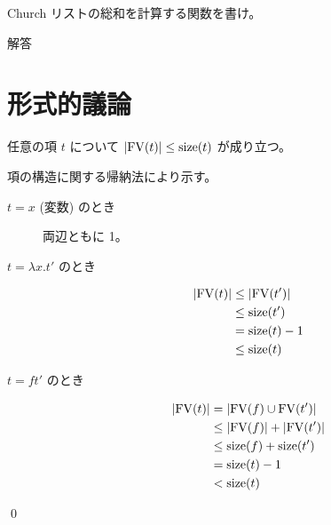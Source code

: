 \begin{jexercise*}[5.2.11]
  Church リストの総和を計算する関数を書け。
\end{jexercise*}
\begin{itembox}[l]{解答}
\end{itembox}

\section{形式的議論}

\begin{jexercise*}[5.3.3]
  任意の項 $t$ について $\left| \operatorname{FV}(t) \right| \leq \operatorname{size}(t)$ が成り立つ。
\end{jexercise*}
\begin{jproof}
  項の構造に関する帰納法により示す。
  \begin{description}
    \item[$t = x$ (変数) のとき]
      両辺ともに 1。
    \item[$t = \lambda x. t'$ のとき]
      \begin{align*}
        \left| \operatorname{FV}(t) \right|
          & \leq \left| \operatorname{FV}(t') \right|
        \\ & \leq \operatorname{size}(t')
        \\ & = \operatorname{size}(t) - 1
        \\ & \leq \operatorname{size}(t)
      \end{align*}
    \item[$t = f t'$ のとき]
      \begin{align*}
        \left| \operatorname{FV}(t) \right|
          & = \left| \operatorname{FV}(f) \cup \operatorname{FV}(t') \right|
        \\ & \leq \left| \operatorname{FV}(f) \right| + \left| \operatorname{FV}(t') \right|
        \\ & \leq \operatorname{size}(f) + \operatorname{size}(t')
        \\ & = \operatorname{size}(t) - 1
        \\ & < \operatorname{size}(t)
      \end{align*}
  \end{description}
  \qed
\end{jproof}
